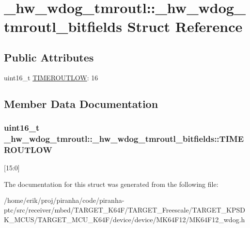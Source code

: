\hypertarget{struct__hw__wdog__tmroutl_1_1__hw__wdog__tmroutl__bitfields}{}\section{\+\_\+hw\+\_\+wdog\+\_\+tmroutl\+:\+:\+\_\+hw\+\_\+wdog\+\_\+tmroutl\+\_\+bitfields Struct Reference}
\label{struct__hw__wdog__tmroutl_1_1__hw__wdog__tmroutl__bitfields}
\subsection*{Public Attributes}
\begin{DoxyCompactItemize}
\item 
uint16\+\_\+t \hyperlink{struct__hw__wdog__tmroutl_1_1__hw__wdog__tmroutl__bitfields_add5f800479603494dcc450bdd022fc02}{T\+I\+M\+E\+R\+O\+U\+T\+L\+OW}\+: 16
\end{DoxyCompactItemize}


\subsection{Member Data Documentation}
\subsubsection[{\texorpdfstring{T\+I\+M\+E\+R\+O\+U\+T\+L\+OW}{TIMEROUTLOW}}]{\setlength{\rightskip}{0pt plus 5cm}uint16\+\_\+t \+\_\+hw\+\_\+wdog\+\_\+tmroutl\+::\+\_\+hw\+\_\+wdog\+\_\+tmroutl\+\_\+bitfields\+::\+T\+I\+M\+E\+R\+O\+U\+T\+L\+OW}\hypertarget{struct__hw__wdog__tmroutl_1_1__hw__wdog__tmroutl__bitfields_add5f800479603494dcc450bdd022fc02}{}\label{struct__hw__wdog__tmroutl_1_1__hw__wdog__tmroutl__bitfields_add5f800479603494dcc450bdd022fc02}
\mbox{[}15\+:0\mbox{]} 

The documentation for this struct was generated from the following file\+:\begin{DoxyCompactItemize}
\item 
/home/erik/proj/piranha/code/piranha-\/ptc/src/receiver/mbed/\+T\+A\+R\+G\+E\+T\+\_\+\+K64\+F/\+T\+A\+R\+G\+E\+T\+\_\+\+Freescale/\+T\+A\+R\+G\+E\+T\+\_\+\+K\+P\+S\+D\+K\+\_\+\+M\+C\+U\+S/\+T\+A\+R\+G\+E\+T\+\_\+\+M\+C\+U\+\_\+\+K64\+F/device/device/\+M\+K64\+F12/M\+K64\+F12\+\_\+wdog.\+h\end{DoxyCompactItemize}
